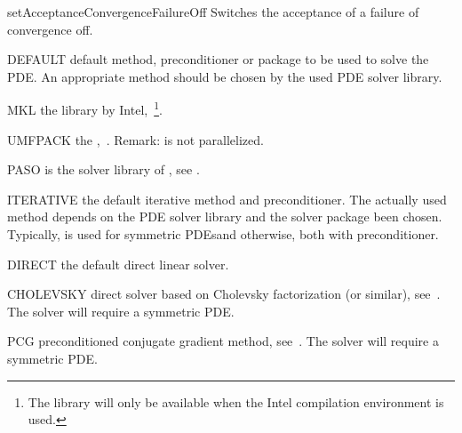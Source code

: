 \begin{methoddesc}[SolverOptions]{setAcceptanceConvergenceFailureOff}{}
Switches the acceptance of a failure of convergence off.
\end{methoddesc}
    
\begin{memberdesc}[SolverOptions]{DEFAULT}
default method, preconditioner or package to be used to solve the PDE. An appropriate method should be
chosen by the used PDE solver library.
\end{memberdesc}

\begin{memberdesc}[SolverOptions]{MKL}
the \MKL library by Intel,~\footnote{The \MKL library will only be available when the Intel compilation environment is used.}.
\end{memberdesc}

\begin{memberdesc}[SolverOptions]{UMFPACK}
the \UMFPACK,~. Remark: \UMFPACK is not parallelized.
\end{memberdesc}

\begin{memberdesc}[SolverOptions]{PASO}
\PASO is the solver library of \finley, see .
\end{memberdesc}

\begin{memberdesc}[SolverOptions]{ITERATIVE}
the default iterative method and preconditioner. The actually used method depends on the PDE solver library and the solver package been chosen. Typically, \PCG is used for symmetric PDEsand \BiCGStab otherwise, both with \JACOBI preconditioner.
\end{memberdesc}

\begin{memberdesc}[SolverOptions]{DIRECT}
the default direct linear solver.
\end{memberdesc}

\begin{memberdesc}[SolverOptions]{CHOLEVSKY}
direct solver based on Cholevsky factorization (or similar), see~. The solver will require a symmetric PDE.
\end{memberdesc}

\begin{memberdesc}[SolverOptions]{PCG}
preconditioned conjugate gradient method, see~. The solver will require a symmetric PDE.
\end{memberdesc}

